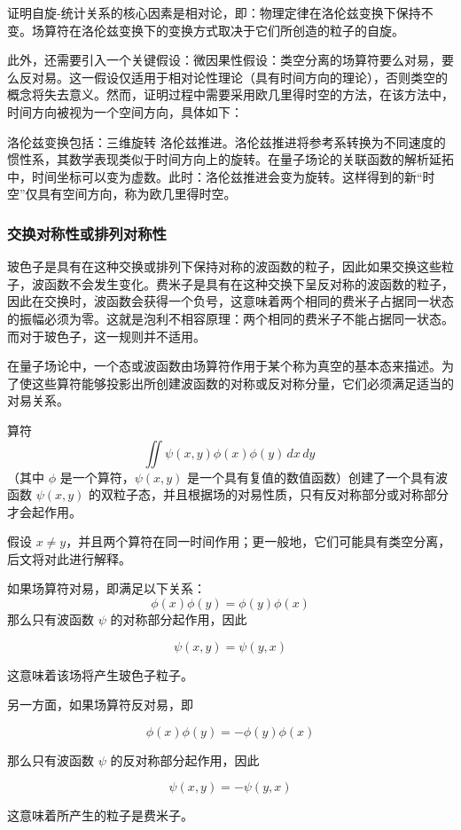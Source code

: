 证明自旋-统计关系的核心因素是相对论，即：物理定律在洛伦兹变换下保持不变。场算符在洛伦兹变换下的变换方式取决于它们所创造的粒子的自旋。  

此外，还需要引入一个关键假设：微因果性假设：类空分离的场算符要么对易，要么反对易。这一假设仅适用于相对论性理论（具有时间方向的理论），否则类空的概念将失去意义。然而，证明过程中需要采用欧几里得时空的方法，在该方法中，时间方向被视为一个空间方向，具体如下：  

洛伦兹变换包括：三维旋转 洛伦兹推进。洛伦兹推进将参考系转换为不同速度的惯性系，其数学表现类似于时间方向上的旋转。在量子场论的关联函数的解析延拓中，时间坐标可以变为虚数。此时：洛伦兹推进会变为旋转。这样得到的新“时空”仅具有空间方向，称为欧几里得时空。
\subsubsection{交换对称性或排列对称性}  
玻色子是具有在这种交换或排列下保持对称的波函数的粒子，因此如果交换这些粒子，波函数不会发生变化。费米子是具有在这种交换下呈反对称的波函数的粒子，因此在交换时，波函数会获得一个负号，这意味着两个相同的费米子占据同一状态的振幅必须为零。这就是泡利不相容原理：两个相同的费米子不能占据同一状态。而对于玻色子，这一规则并不适用。

在量子场论中，一个态或波函数由场算符作用于某个称为真空的基本态来描述。为了使这些算符能够投影出所创建波函数的对称或反对称分量，它们必须满足适当的对易关系。  

算符  
\[
\iint \psi (x,y)\phi (x)\phi (y)\,dx\,dy~
\]
（其中 \(\phi\) 是一个算符，\(\psi (x,y)\) 是一个具有复值的数值函数）创建了一个具有波函数 \(\psi (x,y)\) 的双粒子态，并且根据场的对易性质，只有反对称部分或对称部分才会起作用。

假设 \( x \neq y \)，并且两个算符在同一时间作用；更一般地，它们可能具有类空分离，后文将对此进行解释。  

如果场算符对易，即满足以下关系：  
\[
\phi (x)\phi (y) = \phi (y)\phi (x)
\]
那么只有波函数 \( \psi \) 的对称部分起作用，因此  

\[
\psi (x,y) = \psi (y,x)
\]

这意味着该场将产生玻色子粒子。  

另一方面，如果场算符反对易，即  

\[
\phi (x)\phi (y) = -\phi (y)\phi (x)
\]

那么只有波函数 \( \psi \) 的反对称部分起作用，因此  

\[
\psi (x,y) = -\psi (y,x)
\]

这意味着所产生的粒子是费米子。